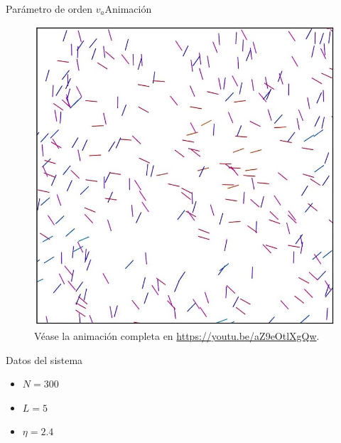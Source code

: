 \documentclass{beamer}
\begin{document}
            \begin{frame}{Parámetro de orden $v_a$}{Animación}
                \begin{minipage}[t]{0.60\textwidth}
                    \begin{figure}[H!]
                        \includegraphics[height=.65\textheight]{./animation-n300-eta2p4-frame}
                        \caption*{Véase la animación completa en \url{https://youtu.be/aZ9eOtlXgQw}.}
                        \label{fig:va_2}
                    \end{figure}
                \end{minipage}
                \hfill
                \begin{minipage}[t]{0.30\textwidth}
                    \begin{block}{Datos del sistema}
                        \begin{itemize}
                            \item $N=300$
                            \item $L=5$
                            \item $\eta=2.4$
                        \end{itemize}
                    \end{block}
                \end{minipage}
            \end{frame}
\end{document}
